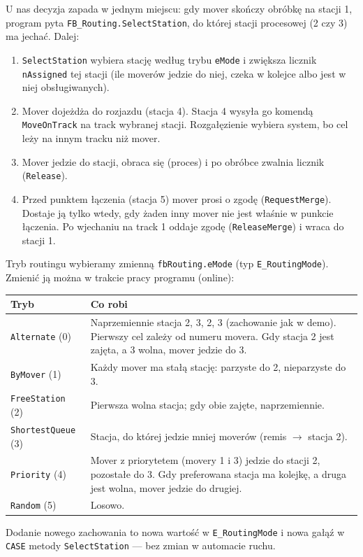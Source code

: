 \documentclass[11pt,a4paper]{report}
\begin{document}
U nas decyzja zapada w jednym miejscu: gdy mover skończy obróbkę na stacji 1, program pyta \texttt{FB\_Routing.SelectStation}, do której stacji procesowej (2 czy 3) ma jechać. Dalej:
\begin{enumerate}
  \item \texttt{SelectStation} wybiera stację według trybu \texttt{eMode} i zwiększa licznik \texttt{nAssigned} tej stacji (ile moverów jedzie do niej, czeka w kolejce albo jest w niej obsługiwanych).
  \item Mover dojeżdża do rozjazdu (stacja 4). Stacja 4 wysyła go komendą \texttt{MoveOnTrack} na track wybranej stacji. Rozgałęzienie wybiera system, bo cel leży na innym tracku niż mover.
  \item Mover jedzie do stacji, obraca się (proces) i po obróbce zwalnia licznik (\texttt{Release}).
  \item Przed punktem łączenia (stacja 5) mover prosi o zgodę (\texttt{RequestMerge}). Dostaje ją tylko wtedy, gdy żaden inny mover nie jest właśnie w punkcie łączenia. Po wjechaniu na track 1 oddaje zgodę (\texttt{ReleaseMerge}) i wraca do stacji 1.
\end{enumerate}
Tryb routingu wybieramy zmienną \texttt{fbRouting.eMode} (typ \texttt{E\_RoutingMode}). Zmienić ją można w trakcie pracy programu (online):
\begin{center}\small
\begin{tabular}{@{}lp{10cm}@{}}
\toprule
\textbf{Tryb} & \textbf{Co robi} \\
\midrule
\texttt{Alternate} (0) & Naprzemiennie stacja 2, 3, 2, 3 (zachowanie jak w demo). Pierwszy cel zależy od numeru movera. Gdy stacja 2 jest zajęta, a 3 wolna, mover jedzie do 3. \\
\texttt{ByMover} (1) & Każdy mover ma stałą stację: parzyste do 2, nieparzyste do 3. \\
\texttt{FreeStation} (2) & Pierwsza wolna stacja; gdy obie zajęte, naprzemiennie. \\
\texttt{ShortestQueue} (3) & Stacja, do której jedzie mniej moverów (remis $\rightarrow$ stacja 2). \\
\texttt{Priority} (4) & Mover z priorytetem (movery 1 i 3) jedzie do stacji 2, pozostałe do 3. Gdy preferowana stacja ma kolejkę, a druga jest wolna, mover jedzie do drugiej. \\
\texttt{Random} (5) & Losowo. \\
\bottomrule
\end{tabular}
\end{center}
Dodanie nowego zachowania to nowa wartość w \texttt{E\_RoutingMode} i nowa gałąź w \texttt{CASE} metody \texttt{SelectStation} --- bez zmian w automacie ruchu.
\end{document}
